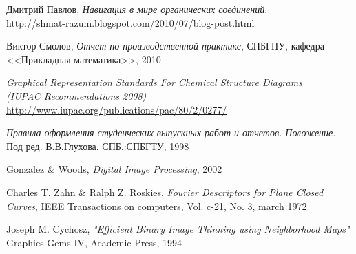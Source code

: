 \begin{thebibliography}{9}

  Дмитрий Павлов,
  \emph{Навигация в мире органических соединений}.\\
  \url{http://shmat-razum.blogspot.com/2010/07/blog-post.html}

  Виктор Смолов,
  \emph{Отчет по производственной практике}, СПБГПУ, кафедра <<Прикладная математика>>, 2010

  \emph{Graphical Representation Standards For Chemical Structure Diagrams \\ (IUPAC Recommendations 2008)} \\
  \url{http://www.iupac.org/publications/pac/80/2/0277/}

  \emph{Правила оформления студенческих выпускных работ и отчетов. Положение.} 
  Под ред. В.В.Глухова.
  СПБ.:СПБГТУ, 1998

  Gonzalez \& Woods,
  \emph{Digital Image Processing}, 2002

  Charles T. Zahn \& Ralph Z. Roskies,
  \emph{Fourier Descriptors for Plane Closed Curves},
   IEEE Transactions on computers, Vol. c-21, No. 3, march 1972

  Joseph M. Cychosz,
  \emph{"Efficient Binary Image Thinning using Neighborhood Maps"}
  Graphics Gems IV, Academic Press, 1994

\end{thebibliography}



